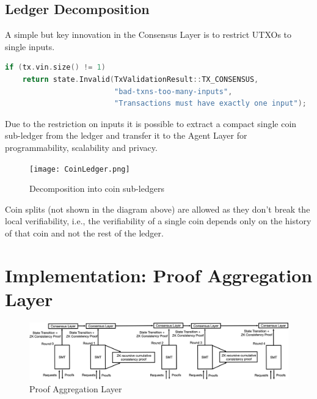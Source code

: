 \documentclass{article}
\begin{document}
\subsection{Ledger Decomposition}

A simple but key innovation in the Consensus Layer is to restrict UTXOs to single inputs.

\begin{minipage}{\linewidth}
\begin{lstlisting}[language=C++]
if (tx.vin.size() != 1)
    return state.Invalid(TxValidationResult::TX_CONSENSUS,
                         "bad-txns-too-many-inputs",
                         "Transactions must have exactly one input");
\end{lstlisting}
\end{minipage}

Due to the restriction on inputs it is possible to extract a compact single coin sub-ledger from the ledger and transfer it to the Agent Layer for programmability, scalability and privacy.

\begin{figure}[H]
    \centering
    \texttt{[image: CoinLedger.png]}
    \caption{Decomposition into coin sub-ledgers}
    \label{fig:coinledger}
\end{figure}

Coin splits (not shown in the diagram above) are allowed as they don't break the local verifiability, i.e., the verifiability of a single coin depends only on the history of that coin and not the rest of the ledger.

\section{Implementation: Proof Aggregation Layer}

\begin{figure}[htbp]
    \centering
    \includegraphics[width=1\textwidth]{SMT-Infra2.png}
    \caption{Proof Aggregation Layer}
    \label{fig:SMT}
\end{figure}
\end{document}
